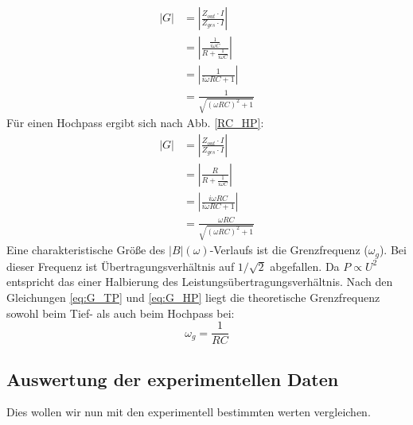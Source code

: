 \documentclass{report}
\begin{document}
\begin{equation}
    \begin{split}
        \left\lvert G \right\rvert  &= \left\lvert \frac{Z_{out} \cdot I}{Z_{ges} \cdot I} \right\rvert \\
                                    &= \left\lvert \frac{\frac{1}{i\omega C}}{R + \frac{1}{i \omega C}} \right\rvert \\
                                    &= \left\lvert \frac{1}{i\omega RC + 1} \right\rvert \\
                                    &= \frac{1}{\sqrt{(\omega RC)^2 + 1}}
    \end{split}
    \label{eq:G_TP}
\end{equation}
Für einen Hochpass ergibt sich nach Abb. \ref{RC_HP}:
\begin{equation}
    \begin{split}
        \left\lvert G \right\rvert  &= \left\lvert \frac{Z_{out} \cdot I}{Z_{ges} \cdot I} \right\rvert \\
                                    &= \left\lvert \frac{R}{R + \frac{1}{i \omega C}} \right\rvert \\
                                    &= \left\lvert \frac{i \omega RC}{i \omega RC + 1} \right\rvert \\
                                    &= \frac{\omega RC}{\sqrt{(\omega RC)^2 + 1}}
    \end{split}
    \label{eq:G_HP}
\end{equation}
Eine charakteristische Größe des $\left\lvert B \right\rvert (\omega)$-Verlaufs ist die Grenzfrequenz ($\omega_g$). Bei dieser
Frequenz ist Übertragungsverhältnis auf $1/\sqrt{2}$ abgefallen. Da $P \propto U^2$ entspricht das einer Halbierung 
des Leistungsübertragungsverhältnis. Nach den Gleichungen \ref{eq:G_TP} und \ref{eq:G_HP} liegt die theoretische Grenzfrequenz
sowohl beim Tief- als auch beim Hochpass bei:
\begin{equation}
    \omega_g = \frac{1}{RC}
    \label{eq:omegaGrenz}
\end{equation}
\newpage
\subsection{Auswertung der experimentellen Daten}
Dies wollen wir nun mit den experimentell bestimmten werten vergleichen. 
\end{document}
